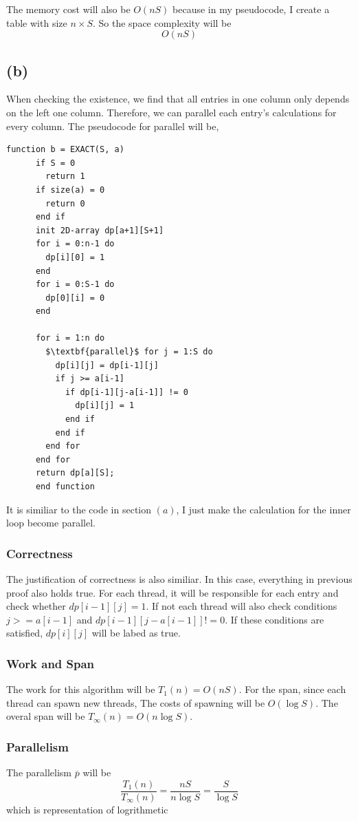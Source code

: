 \documentclass{article}
\begin{document}
The memory cost will also be $O(nS)$ because in my pseudocode, I create a table with size  $n \times S$. So the 
space complexity will be 
$$O(nS)$$


\subsection*{(b)}
When checking the existence, we find that all entries in one column only depends on the left one column.
Therefore, we can parallel each entry's calculations for every column.
The pseudocode for parallel will be,
\begin{multicols}{2}
  \begin{lstlisting}[mathescape=true]
    function b = EXACT(S, a)
      if S = 0 
        return 1
      if size(a) = 0
        return 0
      end if
      init 2D-array dp[a+1][S+1]
      for i = 0:n-1 do
        dp[i][0] = 1
      end
      for i = 0:S-1 do
        dp[0][i] = 0
      end
  
      for i = 1:n do
        $\textbf{parallel}$ for j = 1:S do
          dp[i][j] = dp[i-1][j]
          if j >= a[i-1]
            if dp[i-1][j-a[i-1]] != 0
              dp[i][j] = 1
            end if
          end if
        end for
      end for
      return dp[a][S];
      end function
  \end{lstlisting}
  \end{multicols}
  It is similiar to the code in section $(a)$, I just make the calculation for the inner loop become parallel.
  \subsubsection*{Correctness}
  
  The justification of correctness is also similiar. In this case, everything in previous proof also holds true.
  For each thread, it will be responsible for each entry and check whether $dp[i-1][j] = 1$. If not
  each thread will also check conditions $j >= a[i-1]$ and $dp[i-1][j-a[i-1]] != 0$. If these conditions are satisfied,
  $dp[i][j]$ will be labed as true.

  \subsubsection*{Work and Span}

  The work for this algorithm will be $T_1(n) = O(nS)$. For the span, since each thread can spawn new threads,
  The costs of spawning will be $O(\log S)$. The overal span will be $T_{\infty}(n) = O(n\log S)$.

  \subsubsection*{Parallelism}
  The parallelism $\overline{p}$ will be $$\frac{T_1(n)}{T_{\infty}(n)} = \frac{nS}{n\log S} =\frac{S}{\log S} $$
  which is representation of logrithmetic 
\end{document}
